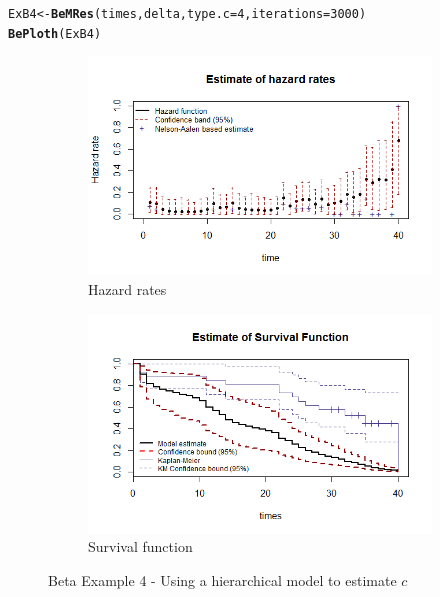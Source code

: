 \documentclass[letterpaper]{article}\usepackage[]{graphicx}\usepackage[]{xcolor}
\makeatletter
\newcommand{\hlnum}[1]{\textcolor[rgb]{0.686,0.059,0.569}{#1}}%
\newcommand{\hlstd}[1]{\textcolor[rgb]{0.345,0.345,0.345}{#1}}%
\newcommand{\hlkwb}[1]{\textcolor[rgb]{0.69,0.353,0.396}{#1}}%
\newcommand{\hlkwc}[1]{\textcolor[rgb]{0.333,0.667,0.333}{#1}}%
\newcommand{\hlkwd}[1]{\textcolor[rgb]{0.737,0.353,0.396}{\textbf{#1}}}%
\newenvironment{kframe}{%
 \def\at@end@of@kframe{}%
 \ifinner\ifhmode%
  \def\at@end@of@kframe{\end{minipage}}%
  \begin{minipage}{\columnwidth}%
 \fi\fi%
 \def\FrameCommand##1{\hskip\@totalleftmargin \hskip-\fboxsep
 \colorbox{shadecolor}{##1}\hskip-\fboxsep
     \hskip-\linewidth \hskip-\@totalleftmargin \hskip\columnwidth}%
 \MakeFramed {\advance\hsize-\width
   \@totalleftmargin\z@ \linewidth\hsize
   \@setminipage}}%
 {\par\unskip\endMakeFramed%
 \at@end@of@kframe}
\newenvironment{knitrout}{}{} %
\makeatother
\begin{document}
\begin{knitrout}
\color{fgcolor}\begin{kframe}
\begin{alltt}
\hlstd{ExB4} \hlkwb{<-} \hlkwd{BeMRes}\hlstd{(times, delta,} \hlkwc{type.c} \hlstd{=} \hlnum{4}\hlstd{,} \hlkwc{iterations} \hlstd{=} \hlnum{3000}\hlstd{)}
\hlkwd{BePloth}\hlstd{(ExB4)}
\end{alltt}
\end{kframe}
\end{knitrout}

\begin{figure}
  \centering
  \begin{subfigure}[a]{\textwidth}\centering
    \includegraphics[width=\textwidth]{B41.png}
    \caption{Hazard rates}
  \end{subfigure}
  \begin{subfigure}[b]{\textwidth}\centering
    \includegraphics[width=\textwidth]{B42.png}
    \caption{Survival function}
  \end{subfigure}
  \caption{Beta Example 4 - Using a hierarchical model to estimate $c$}
  \label{fig:B4}
\end{figure}
\end{document}
